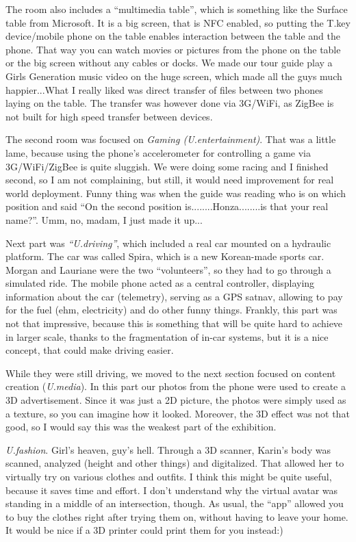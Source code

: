 \begin{post}
\begin{content}
The room also includes a ``multimedia table'', which is something like the Surface table from Microsoft. It is a big screen, that is NFC enabled, so putting the T.key device/mobile phone on the table enables interaction between the table and the phone. That way you can watch movies or pictures from the phone on the table or the big screen without any cables or docks. We made our tour guide play a Girls Generation music video on the huge screen, which made all the guys much happier...What I really liked was direct transfer of files between two phones laying on the table. The transfer was however done via 3G/WiFi, as ZigBee is not built for high speed transfer between devices.

The second room was focused on \textit{Gaming (U.entertainment)}. That was a little lame, because using the phone's accelerometer for controlling a game via 3G/WiFi/ZigBee is quite sluggish. We were doing some racing and I finished second, so I am not complaining, but still, it would need improvement for real world deployment. Funny thing was when the guide was reading who is on which position and said ``On the second position is........Honza........is that your real name?''. Umm, no, madam, I just made it up...

Next part was \textit{``U.driving''}, which included a real car mounted on a hydraulic platform. The car was called Spira, which is a new Korean-made sports car. Morgan and Lauriane were the two ``volunteers'', so they had to go through a simulated ride. The mobile phone acted as a central controller, displaying information about the car (telemetry), serving as a GPS satnav, allowing to pay for the fuel (ehm, electricity) and do other funny things. Frankly, this part was not that impressive, because this is something that will be quite hard to achieve in larger scale, thanks to the fragmentation of in-car systems, but it is a nice concept, that could make driving easier.

While they were still driving, we moved to the next section focused on content creation (\textit{U.media}). In this part our photos from the phone were used to create a 3D advertisement. Since it was just a 2D picture, the photos were simply used as a texture, so you can imagine how it looked. Moreover, the 3D effect was not that good, so I would say this was the weakest part of the exhibition.

\textit{U.fashion}. Girl's heaven, guy's hell. Through a 3D scanner, Karin's body was scanned, analyzed (height and other things) and digitalized. That allowed her to virtually try on various clothes and outfits. I think this might be quite useful, because it saves time and effort. I don't understand why the virtual avatar was standing in a middle of an intersection, though. As usual, the ``app'' allowed you to buy the clothes right after trying them on, without having to leave your home. It would be nice if a 3D printer could print them for you instead:)


\end{content}
\end{post}
